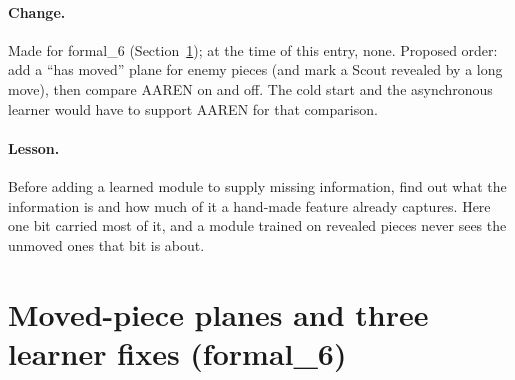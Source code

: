 \paragraph{Change.} Made for formal\_6 (Section~\ref{sec:formal6}); at the time of this entry, none. Proposed order: add a ``has moved'' plane for enemy pieces (and mark
a Scout revealed by a long move), then compare AAREN on and off. The cold start and the
asynchronous learner would have to support AAREN for that comparison.

\paragraph{Lesson.} Before adding a learned module to supply missing information, find out what the
information is and how much of it a hand-made feature already captures. Here one bit carried most
of it, and a module trained on revealed pieces never sees the unmoved ones that bit is about.

\section{Moved-piece planes and three learner fixes (formal\_6)}
\label{sec:formal6}

